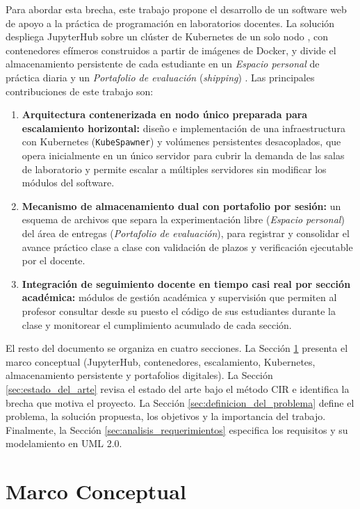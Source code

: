 Para abordar esta brecha, este trabajo propone el desarrollo de un software web de apoyo a la práctica de programación en laboratorios docentes. La solución despliega JupyterHub sobre un clúster de Kubernetes de un solo nodo \cite{z2jh_architecture_2024}, con contenedores efímeros construidos a partir de imágenes de Docker, y divide el almacenamiento persistente de cada estudiante en un \textit{Espacio personal} de práctica diaria y un \textit{Portafolio de evaluación} (\textit{shipping}) \cite{k8s_pv_2024}. Las principales contribuciones de este trabajo son:

\begin{enumerate}
    \item \textbf{Arquitectura contenerizada en nodo único preparada para escalamiento horizontal:} diseño e implementación de una infraestructura con Kubernetes (\texttt{KubeSpawner}) y volúmenes persistentes desacoplados, que opera inicialmente en un único servidor para cubrir la demanda de las salas de laboratorio y permite escalar a múltiples servidores sin modificar los módulos del software.
    \item \textbf{Mecanismo de almacenamiento dual con portafolio por sesión:} un esquema de archivos que separa la experimentación libre (\textit{Espacio personal}) del área de entregas (\textit{Portafolio de evaluación}), para registrar y consolidar el avance práctico clase a clase con validación de plazos y verificación ejecutable por el docente.
    \item \textbf{Integración de seguimiento docente en tiempo casi real por sección académica:} módulos de gestión académica y supervisión que permiten al profesor consultar desde su puesto el código de sus estudiantes durante la clase y monitorear el cumplimiento acumulado de cada sección.
\end{enumerate}

El resto del documento se organiza en cuatro secciones. La Sección \ref{sec:marco_conceptual} presenta el marco conceptual (JupyterHub, contenedores, escalamiento, Kubernetes, almacenamiento persistente y portafolios digitales). La Sección \ref{sec:estado_del_arte} revisa el estado del arte bajo el método CIR e identifica la brecha que motiva el proyecto. La Sección \ref{sec:definicion_del_problema} define el problema, la solución propuesta, los objetivos y la importancia del trabajo. Finalmente, la Sección \ref{sec:analisis_requerimientos} especifica los requisitos y su modelamiento en UML 2.0.

\section{Marco Conceptual}
\label{sec:marco_conceptual}

